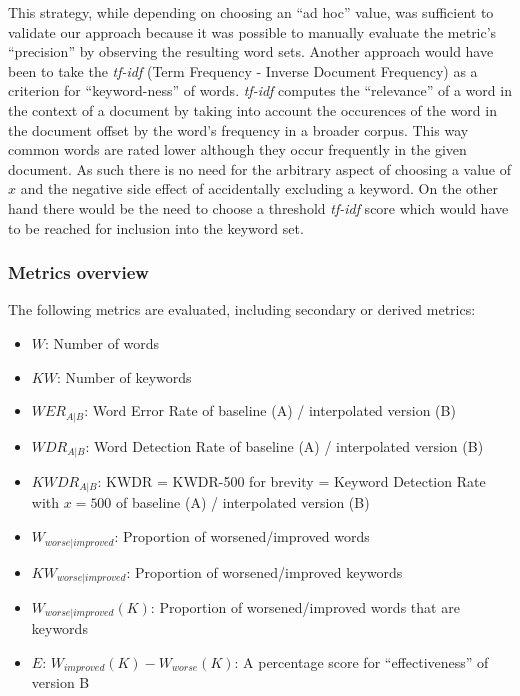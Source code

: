 \documentclass[]{article}
\providecommand{\tightlist}{%
  \setlength{\itemsep}{0pt}\setlength{\parskip}{0pt}}
\begin{document}
This strategy, while depending on choosing an ``ad hoc'' value, was
sufficient to validate our approach because it was possible to manually
evaluate the metric's ``precision'' by observing the resulting word
sets. Another approach would have been to take the \emph{tf-idf} (Term
Frequency - Inverse Document Frequency) as a criterion for
``keyword-ness'' of words. \emph{tf-idf} computes the ``relevance'' of a
word in the context of a document by taking into account the occurences
of the word in the document offset by the word's frequency in a broader
corpus. This way common words are rated lower although they occur
frequently in the given document. As such there is no need for the
arbitrary aspect of choosing a value of \(x\) and the negative side
effect of accidentally excluding a keyword. On the other hand there
would be the need to choose a threshold \emph{tf-idf} score which would
have to be reached for inclusion into the keyword set.

\subsubsection{Metrics overview}\label{metrics-overview}

The following metrics are evaluated, including secondary or derived
metrics:

\begin{itemize}
\tightlist
\item
  \(W\): Number of words
\item
  \(KW\): Number of keywords
\item
  \(WER_{A|B}\): Word Error Rate of baseline (A) / interpolated version
  (B)
\item
  \(WDR_{A|B}\): Word Detection Rate of baseline (A) / interpolated
  version (B)
\item
  \(KWDR_{A|B}\): KWDR = KWDR-500 for brevity = Keyword Detection Rate
  with \(x=500\) of baseline (A) / interpolated version (B)
\item
  \(W_{worse|improved}\): Proportion of worsened/improved words
\item
  \(KW_{worse|improved}\): Proportion of worsened/improved keywords
\item
  \(W_{worse|improved}(K)\): Proportion of worsened/improved words that
  are keywords
\item
  \(E\): \(W_{improved}(K) - W_{worse}(K)\): A percentage score for
  ``effectiveness'' of version B
\end{itemize}
\end{document}

